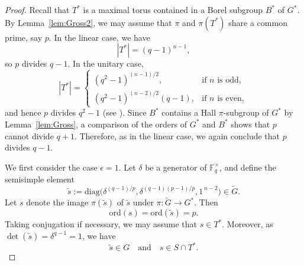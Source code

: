 \documentclass[12pt]{amsart}
\theoremstyle{definition}
\numberwithin{equation}{section}
\newcommand{\ord}{{\mathrm {ord}}}
\newcommand{\diag}{{\mathrm {diag}}}
\newcommand{\FF}{{\mathbb F}}
\begin{document}
\begin{proof}
Recall that $T^*$ is a maximal torus contained in a Borel subgroup
$B^*$ of $G^*$. By Lemma~\ref{lem:Gross2}, we may assume that $\pi$
and $\pi(T^*)$ share a common prime, say $p$. In the linear case, we
have
\[
|T^*| = (q-1)^{n-1},
\]
so %
$p$ divides $q-1$. In the unitary %
case,
\[
|T^*| =
\begin{cases}
(q^2-1)^{(n-1)/2}, & \text{if $n$ is odd},\\[2pt]
(q^2-1)^{(n-2)/2}(q-1), & \text{if $n$ is even},
\end{cases}
\]
and %
hence $p$ divides $q^2-1$ (see \cite[p.~74]{Carter85}). Since
$B^*$ contains a Hall $\pi$-subgroup of $G^*$ by
Lemma~\ref{lem:Gross}, a comparison of the orders of $G^*$ and $B^*$
shows that $p$ cannot divide $q+1$. Therefore, as in the linear
case, we again conclude that $p$ divides $q-1$.



We first consider the case $\epsilon=1$. Let $\delta$ be a generator
of $\FF_{q}^\times$, and define the semisimple %
element
\[
\widetilde{s} := \diag\!\bigl( \delta^{(q-1)/p},
\delta^{(q-1)(p-1)/p}, 1^{\,n-2} \bigr) \in \widetilde{G}.
\]
Let %
$s$ denote the image $\pi(\widetilde{s})$ of $\widetilde{s}$
under $\pi:\widetilde{G}\to G^*$. Then
\[
\ord(s) = \ord(\widetilde{s}) = p.
\]
Taking %
conjugation if necessary, we may assume that $s\in T^*$.
Moreover, as $\det(\widetilde{s})=\delta^{q-1}=1$, we %
have
\[
\widetilde{s}\in G \quad\text{and}\quad s\in S\cap T^*.
\]


\end{proof}
\end{document}
